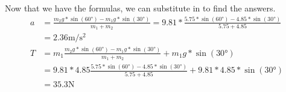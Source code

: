 \documentclass[12pt]{article}
\begin{document}
\pagebreak
Now that we have the formulas, we can substitute in to find the answers.
\begin{align*}
    a &= \frac{m_2 g * \sin(60\unit{\degree}) - m_1 g * \sin(30\unit{\degree})}{m_1 + m_2} 
        = 9.81 * \frac{5.75 * \sin(60\unit{\degree}) - 4.85 * \sin(30\unit{\degree})}{5.75 + 4.85}\\
        &= \boxed{2.36 \unit{\meter/\second^2}}\\
    T &= m_1 \frac{m_2 g * \sin(60\unit{\degree}) - m_1 g * \sin(30\unit{\degree})}{m_1 + m_2} + m_1 g * \sin(30\unit{\degree})\\
        &= 9.81 * 4.85 \frac{5.75 * \sin(60\unit{\degree}) - 4.85 * \sin(30\unit{\degree})}{5.75 + 4.85} + 9.81 * 4.85 * \sin(30\unit{\degree})\\
        &= \boxed{35.3 \unit{\newton}}
\end{align*}
\end{document}
